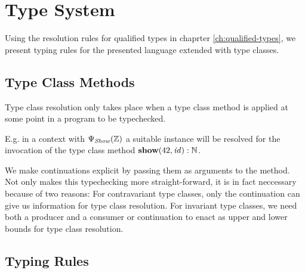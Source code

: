 \chapter{Type System}
\label{ch:type-system}

Using the resolution rules for qualified types in chaprter \ref{ch:qualified-types}, we present typing rules for the presented language extended with type classes.

\section{Type Class Methods}

Type class resolution only takes place when a type class method is applied at some point in a program to be typechecked.

E.g. in a context with $\Psi_\mathit{Show}(\mathbb{Z})$ a suitable instance will be resolved for the invocation of the type class method ${\bf show}(42, \mathit{id}) : \mathbb{N}$.

We make continuations explicit by passing them as arguments to the method.
Not only makes this typechecking more straight-forward, it is in fact neccessary because of two reasons:
For contravariant type classes, only the continuation can give us information for type class resolution.
For invariant type classes, we need both a producer and a consumer or continuation to enact as upper and lower bounds for type class resolution.

\section{Typing Rules}

